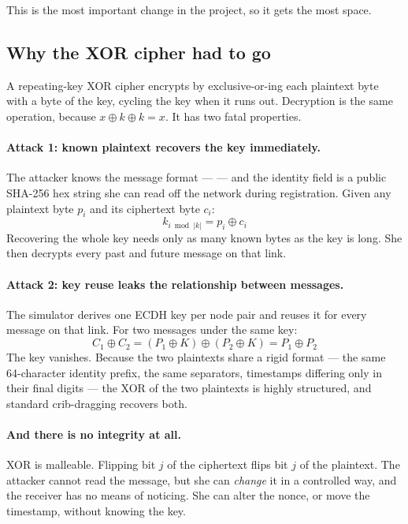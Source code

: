 This is the most important change in the project, so it gets the most space.

\subsection{Why the XOR cipher had to go}

A repeating-key XOR cipher encrypts by exclusive-or-ing each plaintext byte with a byte of
the key, cycling the key when it runs out. Decryption is the same operation, because
$x \oplus k \oplus k = x$. It has two fatal properties.

\paragraph{Attack 1: known plaintext recovers the key immediately.}
The attacker knows the message format ---  --- and the
identity field is a public SHA-256 hex string she can read off the network during
registration. Given any plaintext byte $p_i$ and its ciphertext byte $c_i$:
\begin{equation}
k_{i \bmod |k|} = p_i \oplus c_i
\end{equation}
Recovering the whole key needs only as many known bytes as the key is long. She then
decrypts every past and future message on that link.

\paragraph{Attack 2: key reuse leaks the relationship between messages.}
The simulator derives one ECDH key per node pair and reuses it for every message on that
link. For two messages under the same key:
\begin{equation}
C_1 \oplus C_2 = (P_1 \oplus K) \oplus (P_2 \oplus K) = P_1 \oplus P_2
\end{equation}
The key vanishes. Because the two plaintexts share a rigid format --- the same 64-character
identity prefix, the same separators, timestamps differing only in their final digits ---
the XOR of the two plaintexts is highly structured, and standard crib-dragging recovers
both.

\paragraph{And there is no integrity at all.}
XOR is malleable. Flipping bit $j$ of the ciphertext flips bit $j$ of the plaintext. The
attacker cannot read the message, but she can \emph{change} it in a controlled way, and the
receiver has no means of noticing. She can alter the nonce, or move the timestamp, without
knowing the key.

